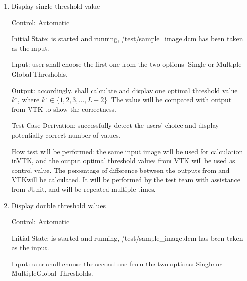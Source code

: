 \documentclass[12pt, titlepage]{article}
\begin{document}
\begin{enumerate}

\item{Display single threshold value}

Control: Automatic
					
Initial State: \progname{} is started and running, /test/sample\_image.dcm has
been taken as the input. 

Input: user shall choose the first one from the two options: Single or Multiple
Global Thresholds.
					
Output: accordingly, \progname{} shall calculate and display one optimal
threshold value $k^{\star}$, where $k^{\star} \in \{1, 2, 3, ..., L-2\}$. The
value will be compared with output from VTK to show the correctness.

Test Case Derivation: successfully detect the users' choice and display
potentially correct number of values.

How test will be performed: the same input image will be used for calculation
inVTK, and the output optimal threshold values from VTK will be used as control
value. The percentage of difference between the outputs from \progname{} and
VTKwill be calculated. It will be performed by the test team with assistance
from
JUnit, and will be repeated multiple times.

\item{Display double threshold values}

Control: Automatic
					
Initial State: \progname{} is started and running, /test/sample\_image.dcm has
been taken as the input.
					
Input: user shall choose the second one from the two options: Single or
MultipleGlobal Thresholds.
					

\end{enumerate}
\end{document}
